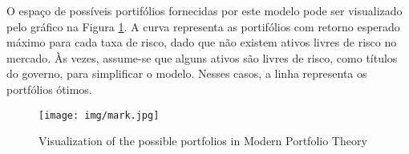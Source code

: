 O espaço de possíveis portifólios fornecidas por este modelo pode ser visualizado pelo gráfico na Figura \ref{fig:mark}. A curva representa as portifólios com retorno esperado máximo para cada taxa de risco, dado que não existem ativos livres de risco no mercado. Às vezes, assume-se que alguns ativos são livres de risco, como títulos do governo, para simplificar o modelo. Nesses casos, a linha representa os portfólios ótimos.

\begin{figure}
  \centering
    \texttt{[image: img/mark.jpg]}
  \caption{Visualization of the possible portfolios in Modern Portfolio Theory}
  \label{fig:mark}
\end{figure}